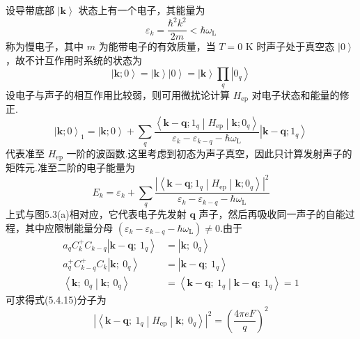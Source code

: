 设导带底部 $\left|\boldsymbol{k}\right\rangle$ 状态上有一个电子，其能量为
\begin{equation}
  \varepsilon_k=\frac{\hbar^2k^2}{2m}<\hbar\omega_{\mathrm{L}}
\end{equation}
称为慢电子，其中 $m$ 为能带电子的有效质量，当 $T=0$ K 时声子处于真空态 $\left|0\right\rangle$，故不计互作用时系统的状态为
\begin{equation}
  \left|\boldsymbol{k};0\right\rangle=\left|\boldsymbol{k}\right\rangle\left|0\right\rangle
  =\left|\boldsymbol{k}\right\rangle\prod_{q}\left|0_q\right\rangle
\end{equation}
设电子与声子的相互作用比较弱，则可用微扰论计算 $H_{\mathrm{ep}}$ 对电子状态和能量的修正.
\begin{equation}
  \left|\boldsymbol{k};0\right\rangle_1=\left|\boldsymbol{k};0\right\rangle+\sum_{q}
  \frac{\left\langle \boldsymbol{k}-\boldsymbol{q};1_q\middle|H_{\mathrm{ep}}\middle|\boldsymbol{k};0_q\right\rangle}
  {\varepsilon_k-\varepsilon_{k-q}-\hbar\omega_{\mathrm{L}}}
  \left|\boldsymbol{k}-\boldsymbol{q};1_q\right\rangle
\end{equation}
代表准至 $H_{\mathrm{ep}}$ 一阶的波函数.这里考虑到初态为声子真空，因此只计算发射声子的矩阵元.准至二阶的电子能量为
\begin{equation}
  E_k=\varepsilon_k+\sum_{q}
  \frac{\left|\left\langle \boldsymbol{k}-\boldsymbol{q};1_q\middle|H_{\mathrm{ep}}\middle|\boldsymbol{k};0_q\right\rangle\right|^2}
  {\varepsilon_k-\varepsilon_{k-q}-\hbar\omega_{\mathrm{L}}}
\end{equation}
上式与图5.3(a)相对应，它代表电子先发射 $\boldsymbol{q}$ 声子，然后再吸收同一声子的自能过程，其中应限制能量分母 $\left(\varepsilon_k-\varepsilon_{k-q}-\hbar\omega_{\mathrm{L}}\right)\neq 0$.由于
\begin{equation}
\begin{aligned}
  a_qC_k^{+}C_{k-q}\left|\boldsymbol{k}-\boldsymbol{q};\ 1_q\right\rangle&=\left|\boldsymbol{k};\ 0_q\right\rangle\\
  a_q^{+}C_{k-q}^{+}C_k\left|\boldsymbol{k};\ 0_q\right\rangle&=\left|\boldsymbol{k}-\boldsymbol{q};\ 1_q\right\rangle\\
  \left\langle \boldsymbol{k};\ 0_q\middle|\boldsymbol{k};\ 0_q\right\rangle
  &=\left\langle \boldsymbol{k}-\boldsymbol{q};\ 1_q\middle|\boldsymbol{k}-\boldsymbol{q};\ 1_q\right\rangle=1
\end{aligned}
\end{equation}
可求得式(5.4.15)分子为
\begin{equation}
  \left|\left\langle \boldsymbol{k}-\boldsymbol{q};\ 1_q\middle|H_{\mathrm{ep}}\middle|\boldsymbol{k};\ 0_q\right\rangle\right|^2
  =\left(\frac{4\pi eF}{q}\right)^2
\end{equation}
